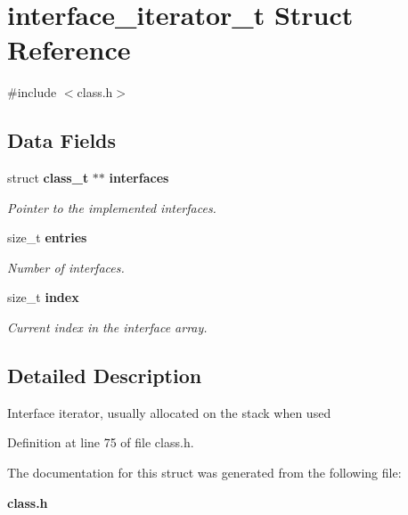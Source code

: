 \section{interface\_\-iterator\_\-t Struct Reference}
\label{structinterface__iterator__t}


{\ttfamily \#include $<$class.h$>$}

\subsection*{Data Fields}
\begin{DoxyCompactItemize}
\item 
struct {\bf class\_\-t} $\ast$$\ast$ {\bf interfaces}\label{structinterface__iterator__t_a9f8d91d909c0b1b7cf0faf4a13a37054}

\begin{DoxyCompactList}\small\item\em Pointer to the implemented interfaces. \item\end{DoxyCompactList}\item 
size\_\-t {\bf entries}\label{structinterface__iterator__t_aa48c8225b619ca85371f8f2124235ba7}

\begin{DoxyCompactList}\small\item\em Number of interfaces. \item\end{DoxyCompactList}\item 
size\_\-t {\bf index}\label{structinterface__iterator__t_a39415fd654efb0f46337efb2676d164d}

\begin{DoxyCompactList}\small\item\em Current index in the interface array. \item\end{DoxyCompactList}\end{DoxyCompactItemize}


\subsection{Detailed Description}
Interface iterator, usually allocated on the stack when used 

Definition at line 75 of file class.h.



The documentation for this struct was generated from the following file:\begin{DoxyCompactItemize}
\item 
{\bf class.h}\end{DoxyCompactItemize}
